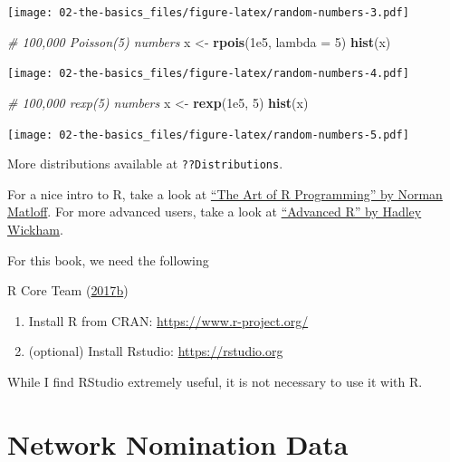 \documentclass[]{book}
\newenvironment{Shaded}{\begin{snugshade}}{\end{snugshade}}
\newcommand{\CommentTok}[1]{\textcolor[rgb]{0.56,0.35,0.01}{\textit{#1}}}
\newcommand{\DataTypeTok}[1]{\textcolor[rgb]{0.13,0.29,0.53}{#1}}
\newcommand{\DecValTok}[1]{\textcolor[rgb]{0.00,0.00,0.81}{#1}}
\newcommand{\FloatTok}[1]{\textcolor[rgb]{0.00,0.00,0.81}{#1}}
\newcommand{\KeywordTok}[1]{\textcolor[rgb]{0.13,0.29,0.53}{\textbf{#1}}}
\newcommand{\NormalTok}[1]{#1}
\newcommand{\StringTok}[1]{\textcolor[rgb]{0.31,0.60,0.02}{#1}}
\begin{document}
\begin{enumerate}
  \texttt{[image: 02-the-basics\_files/figure-latex/random-numbers-3.pdf]}

\begin{Shaded}
\begin{Highlighting}[]
\CommentTok{# 100,000 Poisson(5) numbers}
\NormalTok{x <-}\StringTok{ }\KeywordTok{rpois}\NormalTok{(}\FloatTok{1e5}\NormalTok{, }\DataTypeTok{lambda =} \DecValTok{5}\NormalTok{)}
\KeywordTok{hist}\NormalTok{(x)}
\end{Highlighting}
\end{Shaded}

  \texttt{[image: 02-the-basics\_files/figure-latex/random-numbers-4.pdf]}

\begin{Shaded}
\begin{Highlighting}[]
\CommentTok{# 100,000 rexp(5) numbers}
\NormalTok{x <-}\StringTok{ }\KeywordTok{rexp}\NormalTok{(}\FloatTok{1e5}\NormalTok{, }\DecValTok{5}\NormalTok{)}
\KeywordTok{hist}\NormalTok{(x)}
\end{Highlighting}
\end{Shaded}

  \texttt{[image: 02-the-basics\_files/figure-latex/random-numbers-5.pdf]}

  More distributions available at \texttt{??Distributions}.
\end{enumerate}

For a nice intro to R, take a look at \href{https://nostarch.com/artofr.htm}{``The Art of R Programming'' by Norman Matloff}. For more advanced users, take a look at \href{http://adv-r.had.co.nz/}{``Advanced R'' by Hadley Wickham}.

For this book, we need the following

R Core Team (\protect\hyperlink{ref-R}{2017}\protect\hyperlink{ref-R}{b})

\begin{enumerate}
\def\labelenumi{\arabic{enumi}.}
\item
  Install R from CRAN: \url{https://www.r-project.org/}
\item
  (optional) Install Rstudio: \url{https://rstudio.org}
\end{enumerate}

While I find RStudio extremely useful, it is not necessary to use it with R.

\hypertarget{network-nomination-data}{%
\chapter{Network Nomination Data}\label{network-nomination-data}}
\end{document}
